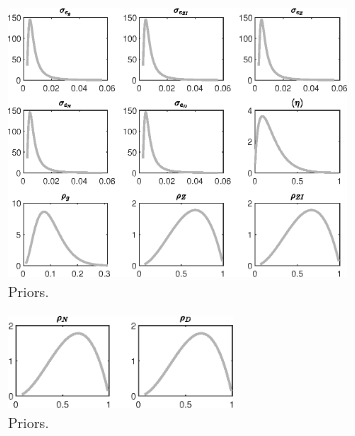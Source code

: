  
\begin{figure}[H]
\centering
\includegraphics[width=0.80\textwidth]{BRS_growth_sep/graphs/BRS_growth_sep_Priors1}
\caption{Priors.}\label{Fig:Priors:1}
\end{figure}
\begin{figure}[H]
\centering
\includegraphics[width=0.53\textwidth]{BRS_growth_sep/graphs/BRS_growth_sep_Priors2}
\caption{Priors.}\label{Fig:Priors:2}
\end{figure}
 
